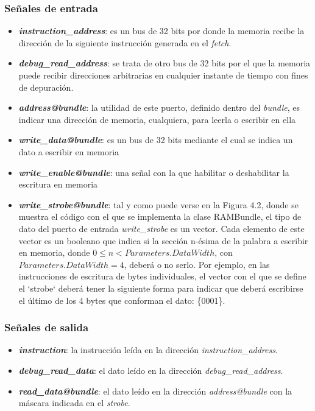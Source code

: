 \subsubsection{Señales de entrada}

\begin{itemize}
  \item \textbf{\textit{instruction\_address}}: es un bus de 32 bits por donde la memoria recibe la dirección de la siguiente instrucción generada en el \textit{fetch}.
  \vspace{-0.2cm}
  \item \textbf{\textit{debug\_read\_address}}: se trata de otro bus de 32 bits por el que la memoria puede recibir direcciones arbitrarias en cualquier instante de tiempo con fines de depuración.
  \vspace{-0.2cm}
  \item \textbf{\textit{address@bundle}}: la utilidad de este puerto, definido dentro del \textit{bundle}, es indicar una dirección de memoria, cualquiera, para leerla o escribir en ella
  \vspace{-0.2cm}
  \item \textbf{\textit{write\_data@bundle}}: es un bus de 32 bits mediante el cual se indica un dato a escribir en memoria
  \vspace{-0.2cm}
  \item \textbf{\textit{write\_enable@bundle}}: una señal con la que habilitar o deshabilitar la escritura en memoria
  \vspace{-0.2cm}
  \item \textbf{\textit{write\_strobe@bundle}}: tal y como puede verse en la Figura 4.2, donde se muestra el código con el que se implementa la clase RAMBundle, el tipo de dato del puerto de entrada \textit{write\_strobe} es un vector. Cada elemento de este vector es un booleano que indica si la sección n-ésima de la palabra a escribir en memoria, donde $0 \le n < Parameters.DataWidth$, con $Parameters.DataWidth = 4$, deberá o no serlo. Por ejemplo, en las instrucciones de escritura de bytes individuales, el vector con el que se define el `strobe` deberá tener la siguiente forma para indicar que deberá escribirse el último de los 4 bytes que conforman el dato: \{0001\}.
\end{itemize}

\subsubsection{Señales de salida}
\begin{itemize}
  \item \textbf{\textit{instruction}}: la instrucción leída en la dirección \textit{instruction\_address}.
  \vspace{-0.2cm}
  \item \textbf{\textit{debug\_read\_data}}: el dato leído en la dirección \textit{debug\_read\_address}.
  \vspace{-0.2cm}
  \item \textbf{\textit{read\_data@bundle}}: el dato leído en la dirección \textit{address@bundle} con la máscara indicada en el \textit{strobe}.
\end{itemize}

